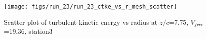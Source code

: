 \begin{figure}[H]
\centering
\texttt{[image: figs/run\_23/run\_23\_ctke\_vs\_r\_mesh\_scatter]}
\caption{Scatter plot of turbulent kinetic energy vs radius at $z/c$=7.75, $V_{free}$=19.36, station3}
\label{fig:run_23_ctke_vs_r_mesh_scatter}
\end{figure}


